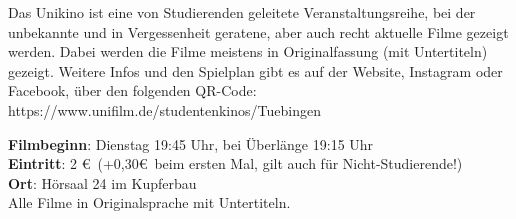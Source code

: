 Das Unikino ist eine von Studierenden geleitete Veranstaltungsreihe, bei der
unbekannte und in Vergessenheit geratene, aber auch recht aktuelle Filme
gezeigt werden. Dabei werden die Filme meistens in Originalfassung (mit
Untertiteln) gezeigt. Weitere Infos und den Spielplan gibt es auf der Website, 
Instagram oder Facebook, über den folgenden QR-Code:
\\





\scriptsize{https://www.unifilm.de/studentenkinos/Tuebingen}



\textbf{Filmbeginn}: Dienstag 19:45 Uhr, bei Überlänge 19:15 Uhr\\
\textbf{Eintritt}: 2 \euro ~(+0,30\euro \ beim ersten Mal, gilt auch für Nicht-Studierende!)\\
\textbf{Ort}: Hörsaal 24 im Kupferbau\\
Alle Filme in Originalsprache mit Untertiteln.

\normalsize

